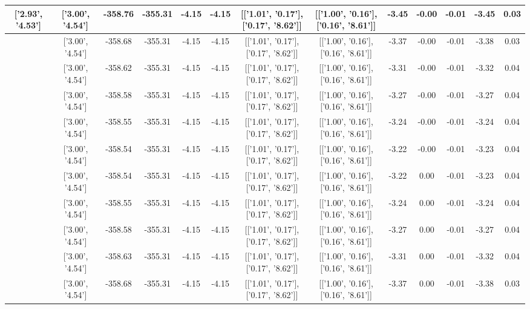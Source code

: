 \begin{table}[htbp]
\begin{adjustbox}{angle=90}
\begin{tabular}{|c|c|c|c|c|c|c|c|c|c|c|c|c|}
 ['2.93', '4.53'] & ['3.00', '4.54'] & -358.76 & -355.31 & -4.15 & -4.15 & [['1.01', '0.17'], ['0.17', '8.62']] & [['1.00', '0.16'], ['0.16', '8.61']] & -3.45 & -0.00 & -0.01 & -3.45 & 0.03\\ \hline
 ['2.94', '4.53'] & ['3.00', '4.54'] & -358.68 & -355.31 & -4.15 & -4.15 & [['1.01', '0.17'], ['0.17', '8.62']] & [['1.00', '0.16'], ['0.16', '8.61']] & -3.37 & -0.00 & -0.01 & -3.38 & 0.03\\ \hline
 ['2.96', '4.54'] & ['3.00', '4.54'] & -358.62 & -355.31 & -4.15 & -4.15 & [['1.01', '0.17'], ['0.17', '8.62']] & [['1.00', '0.16'], ['0.16', '8.61']] & -3.31 & -0.00 & -0.01 & -3.32 & 0.04\\ \hline
 ['2.97', '4.54'] & ['3.00', '4.54'] & -358.58 & -355.31 & -4.15 & -4.15 & [['1.01', '0.17'], ['0.17', '8.62']] & [['1.00', '0.16'], ['0.16', '8.61']] & -3.27 & -0.00 & -0.01 & -3.27 & 0.04\\ \hline
 ['2.98', '4.54'] & ['3.00', '4.54'] & -358.55 & -355.31 & -4.15 & -4.15 & [['1.01', '0.17'], ['0.17', '8.62']] & [['1.00', '0.16'], ['0.16', '8.61']] & -3.24 & -0.00 & -0.01 & -3.24 & 0.04\\ \hline
 ['2.99', '4.54'] & ['3.00', '4.54'] & -358.54 & -355.31 & -4.15 & -4.15 & [['1.01', '0.17'], ['0.17', '8.62']] & [['1.00', '0.16'], ['0.16', '8.61']] & -3.22 & -0.00 & -0.01 & -3.23 & 0.04\\ \hline
 ['3.00', '4.54'] & ['3.00', '4.54'] & -358.54 & -355.31 & -4.15 & -4.15 & [['1.01', '0.17'], ['0.17', '8.62']] & [['1.00', '0.16'], ['0.16', '8.61']] & -3.22 & 0.00 & -0.01 & -3.23 & 0.04\\ \hline
 ['3.02', '4.54'] & ['3.00', '4.54'] & -358.55 & -355.31 & -4.15 & -4.15 & [['1.01', '0.17'], ['0.17', '8.62']] & [['1.00', '0.16'], ['0.16', '8.61']] & -3.24 & 0.00 & -0.01 & -3.24 & 0.04\\ \hline
 ['3.03', '4.54'] & ['3.00', '4.54'] & -358.58 & -355.31 & -4.15 & -4.15 & [['1.01', '0.17'], ['0.17', '8.62']] & [['1.00', '0.16'], ['0.16', '8.61']] & -3.27 & 0.00 & -0.01 & -3.27 & 0.04\\ \hline
 ['3.04', '4.54'] & ['3.00', '4.54'] & -358.63 & -355.31 & -4.15 & -4.15 & [['1.01', '0.17'], ['0.17', '8.62']] & [['1.00', '0.16'], ['0.16', '8.61']] & -3.31 & 0.00 & -0.01 & -3.32 & 0.04\\ \hline
 ['3.05', '4.54'] & ['3.00', '4.54'] & -358.68 & -355.31 & -4.15 & -4.15 & [['1.01', '0.17'], ['0.17', '8.62']] & [['1.00', '0.16'], ['0.16', '8.61']] & -3.37 & 0.00 & -0.01 & -3.38 & 0.03\\ \hline

\end{tabular}
\end{adjustbox}
\end{table}
